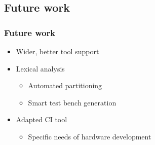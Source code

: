 \documentclass[british,10pt]{beamer}
\begin{document}

\subsection{Future work}

\begin{frame}\frametitle{Future work}
\begin{itemize}
\item Wider, better tool support
\item Lexical analysis
\begin{itemize}
\item Automated partitioning
\item Smart test bench generation
\end{itemize}
\item Adapted CI tool
\begin{itemize}
\item Specific needs of hardware development
\end{itemize}
\end{itemize}
\end{frame}
\end{document}
